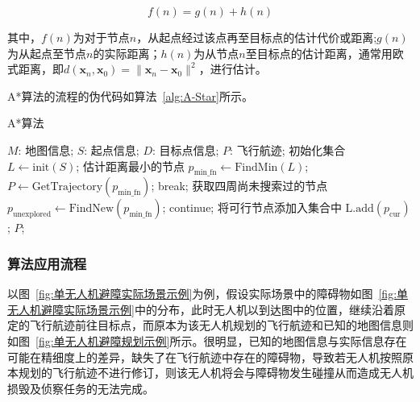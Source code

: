 \begin{equation}
    f(n) = g(n) + h(n) \nonumber
\end{equation}

其中，\( f(n) \)为对于节点\( n \)，从起点经过该点再至目标点的估计代价或距离;\( g(n) \)为从起点至节点\( n \)的实际距离；\( h(n) \)为从节点\( n \)至目标点的估计距离，通常用欧式距离，即\( d(\boldsymbol{x}_n, \boldsymbol{x}_0) = \parallel \boldsymbol{x}_n - \boldsymbol{x}_0 \parallel ^ 2\)，进行估计。

A*算法的流程的伪代码如算法~\ref{alg:A-Star}所示。

\begin{algorithm}[!htbp]
  \caption{A*算法} %
  \label{alg:A-Star}
  \begin{algorithmic}[1]
    \REQUIRE
      $M$: 地图信息;
      $S$: 起点信息;
      $D$: 目标点信息;
    \ENSURE
      $P$: 飞行航迹;
    \STATE 初始化集合 \( L \gets \text{init}(S)\);
        \STATE 估计距离最小的节点 \( p_\textrm{min\_fn} \gets \textrm{FindMin}(L) \);
            \STATE \( P \gets \textrm{GetTrajectory}(p_{\textrm{min\_fn}}) \);
            \STATE break;
        \ENDIF
        \STATE 获取四周尚未搜索过的节点 \( p_\textrm{unexplored} \gets \text{FindNew} (p_{\textrm{min\_fn}}) \);
                \STATE continue;
            \ENDIF
            \STATE 将可行节点添加入集合中 \( \text{L.add}(p_{\textrm{cur}})\);
        \ENDFOR
    \ENDWHILE
    \RETURN \( P \);
  \end{algorithmic}
\end{algorithm}

\subsubsection{算法应用流程}

以图~\ref{fig:单无人机避障实际场景示例}为例，假设实际场景中的障碍物如图~\ref{fig:单无人机避障实际场景示例}中的分布，此时无人机以到达图中的位置，继续沿着原定的飞行航迹前往目标点，而原本为该无人机规划的飞行航迹和已知的地图信息则如图~\ref{fig:单无人机避障规划示例}所示。很明显，已知的地图信息与实际信息存在可能在精细度上的差异，缺失了在飞行航迹中存在的障碍物，导致若无人机按照原本规划的飞行航迹不进行修订，则该无人机将会与障碍物发生碰撞从而造成无人机损毁及侦察任务的无法完成。

